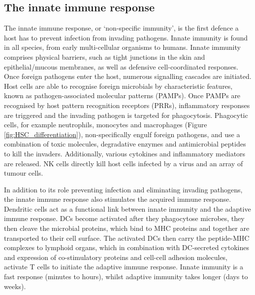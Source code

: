 \subsection{The innate immune response}
The innate immune response, or `non-specific immunity', is the first defence a host has to prevent infection from invading pathogens\cite{alberts2007molecularimmune}.
Innate immunity is found in all species, from early multi-cellular organisms to humans\cite{hoffmann2013innate}.
Innate immunity comprises physical barriers, such as tight junctions in the skin and epithelial/mucous membranes, as well as defensive cell-coordinated responses.
Once foreign pathogens enter the host, numerous signalling cascades are initiated.
Host cells are able to recognise foreign microbials by characteristic features, known as pathogen-associated molecular patterns (PAMPs).
Once PAMPs are recognised by host pattern recognition receptors (PRRs), inflammatory responses are triggered and the invading pathogen is targeted for phagocytosis.
Phagocytic cells, for example neutrophils, monocytes and macrophages (Figure \ref{fig:HSC_differentiation}), non-specifically engulf foreign pathogens, and use a combination of toxic molecules, degradative enzymes and antimicrobial peptides to kill the invaders.
Additionally, various cytokines and inflammatory mediators are released.
NK cells directly kill host cells infected by a virus\cite{alberts2007molecularimmune} and an array of tumour cells\cite{hoffmann2013innate}.

In addition to its role preventing infection and eliminating invading pathogens, the innate immune response also stimulates the acquired immune response.
Dendritic cells act as a functional link between innate immunity and the adaptive immune response.
DCs become activated after they phagocytose microbes, they then cleave the microbial proteins, which bind to MHC proteins and together are transported to their cell surface.
The activated DCs then carry the peptide-MHC complexes to lymphoid organs, which in combination with DC-secreted cytokines and expression of co-stimulatory proteins and cell-cell adhesion molecules, activate T cells to initiate the adaptive immune response.
Innate immunity is a fast response (minutes to hours), whilst adaptive immunity takes longer (days to weeks)\cite{alberts2007molecularimmune}.

